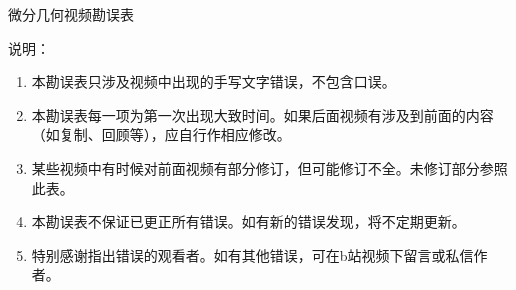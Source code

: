 \documentclass{article}
\begin{document}
	

\begin{center}
	 微分几何视频勘误表
\end{center}
	说明：	
	\begin{enumerate}
		\item 本勘误表只涉及视频中出现的手写文字错误，不包含口误。
		\item 本勘误表每一项为第一次出现大致时间。如果后面视频有涉及到前面的内容（如复制、回顾等），应自行作相应修改。
		\item 某些视频中有时候对前面视频有部分修订，但可能修订不全。未修订部分参照此表。
		\item 本勘误表不保证已更正所有错误。如有新的错误发现，将不定期更新。
		\item 特别感谢指出错误的观看者。如有其他错误，可在b站视频下留言或私信作者。
	\end{enumerate}	
	\centering
	\renewcommand\arraystretch{2}
\end{document}
